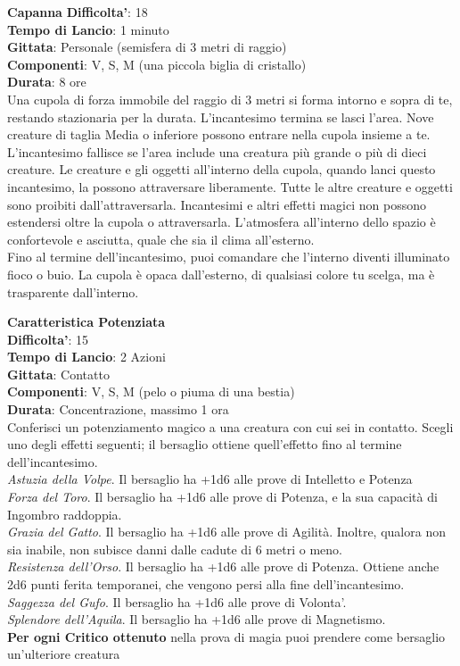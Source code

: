 \begin{multicols}{2}
\medskip\textbf{Capanna}
\textbf{Difficolta'}: 18\\
\textbf{Tempo di Lancio}: 1 minuto\\
\textbf{Gittata}: Personale (semisfera di 3 metri di raggio)\\
\textbf{Componenti}: V, S, M (una piccola biglia di cristallo)\\
\textbf{Durata}: 8 ore\\
Una cupola di forza immobile del raggio di 3 metri si forma intorno e sopra di te, restando stazionaria per la durata. L’incantesimo termina se lasci l’area. Nove creature di taglia Media o inferiore possono entrare nella cupola insieme a te. L’incantesimo fallisce se l’area include una creatura più grande o più di dieci creature. Le creature e gli oggetti all’interno della cupola, quando lanci questo incantesimo, la possono attraversare liberamente. Tutte le altre creature e oggetti sono proibiti dall’attraversarla. Incantesimi e altri effetti magici non possono estendersi oltre la cupola o attraversarla. L’atmosfera all’interno dello spazio è confortevole e asciutta, quale che sia il clima all’esterno.\\
Fino al termine dell’incantesimo, puoi comandare che l’interno diventi illuminato fioco o buio. La cupola è opaca dall’esterno, di qualsiasi colore tu scelga, ma è trasparente dall’interno. 


\medskip\textbf{Caratteristica Potenziata}\\
\textbf{Difficolta'}: 15\\
\textbf{Tempo di Lancio}: 2 Azioni\\
\textbf{Gittata}: Contatto\\
\textbf{Componenti}: V, S, M (pelo o piuma di una bestia)\\
\textbf{Durata}: Concentrazione, massimo 1 ora\\
Conferisci un potenziamento magico a una creatura con cui sei in contatto. Scegli uno degli effetti seguenti; il bersaglio ottiene quell’effetto fino al termine dell’incantesimo.\\
\textit{Astuzia della Volpe}. Il bersaglio ha +1d6 alle prove di Intelletto e Potenza\\
\textit{Forza del Toro}. Il bersaglio ha +1d6 alle prove di Potenza, e la sua capacità di Ingombro raddoppia.\\
\textit{Grazia del Gatto}. Il bersaglio ha +1d6 alle prove di Agilità. Inoltre, qualora non sia inabile, non subisce danni dalle cadute di 6 metri o meno.\\
\textit{Resistenza dell’Orso}. Il bersaglio ha +1d6 alle prove di Potenza. Ottiene anche 2d6 punti ferita temporanei, che vengono persi alla fine dell’incantesimo.\\
\textit{Saggezza del Gufo}. Il bersaglio ha +1d6 alle prove di Volonta'. \\
\textit{Splendore dell’Aquila}. Il bersaglio ha +1d6 alle prove di Magnetismo.\\
\textbf{Per ogni Critico ottenuto} nella prova di magia puoi prendere come bersaglio un’ulteriore creatura


\end{multicols}
